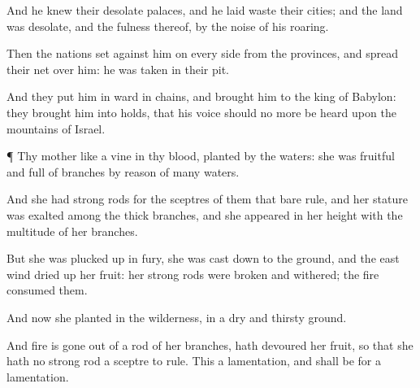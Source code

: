 {And he
knew their desolate
palaces, and he laid
waste their
cities; and the
land was
desolate, and the
fulness thereof, by the
noise of his
roaring.

Then the
nations
set against him on every
side from the
provinces, and
spread their
net over him: he was
taken in their
pit.

And they
put him in
ward in
chains, and
brought him to the
king of
Babylon: they
brought him into
holds, that his
voice should no more be
heard upon the
mountains of
Israel.


\par }{\PP {}¶ Thy
mother
{} like a
vine in thy
blood,
planted by the
waters: she was
fruitful and full of
branches by reason of
many
waters.

And she had
strong
rods for the
sceptres of them that bare
rule, and her
stature was
exalted among the thick
branches, and she
appeared in her
height with the
multitude of her
branches.

But she was plucked
up in
fury, she was cast
down to the
ground, and the
east
wind dried
up her
fruit: her
strong
rods were
broken and
withered; the
fire
consumed them.

And now she
{}
planted in the
wilderness, in a
dry and
thirsty
ground.

And
fire is gone
out of a
rod of her
branches,
{} hath
devoured her
fruit, so that she hath no
strong
rod
{} a
sceptre to
rule. This
{} a
lamentation, and shall be for a
lamentation.




\par }
